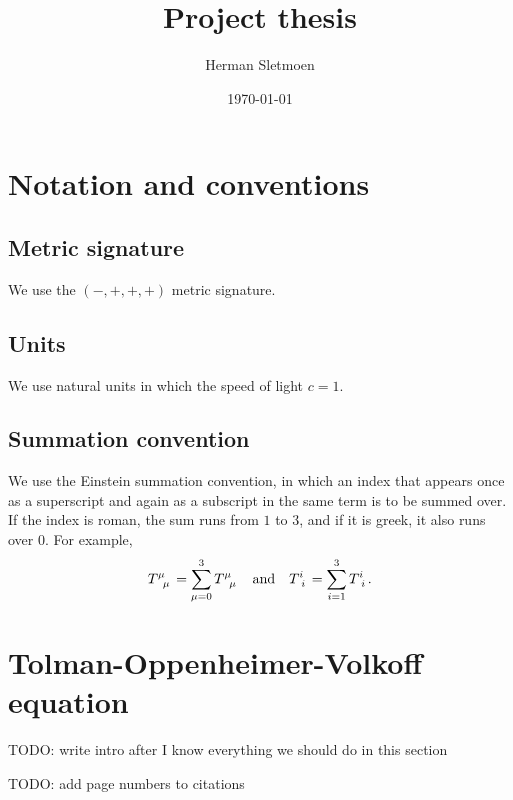 \documentclass[a4paper,11pt,twoside]{report}
\title{Project thesis}
\author{Herman Sletmoen}
\date{\today}
\begin{document}
\maketitle

\tableofcontents

\chapter*{Notation and conventions} %

\section*{Metric signature}

We use the $(-,+,+,+)$ metric signature.

\section*{Units}

We use natural units in which the speed of light $c = 1$.

\section*{Summation convention}

We use the Einstein summation convention, in which an index that appears once as a superscript and again as a subscript in the same term is to be summed over.
If the index is roman, the sum runs from $1$ to $3$, and if it is greek, it also runs over $0$.
For example,
\begin{equation*}
	T\indices{^\mu_\mu} = \sum_{\mu=0}^3 T\indices{^\mu_\mu}
	\quad \text{and} \quad
	T\indices{^i_i} = \sum_{i=1}^3 T\indices{^i_i}
	.
\end{equation*}

\chapter{Tolman-Oppenheimer-Volkoff equation}

TODO: write intro after I know everything we should do in this section

TODO: add page numbers to citations
\end{document}
